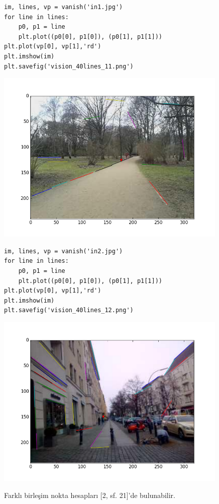 \documentclass[12pt,fleqn]{article}\usepackage{../../common}
\begin{document}
\begin{verbatim}
im, lines, vp = vanish('in1.jpg')
for line in lines:
    p0, p1 = line
    plt.plot((p0[0], p1[0]), (p0[1], p1[1]))
plt.plot(vp[0], vp[1],'rd')
plt.imshow(im)
plt.savefig('vision_40lines_11.png')
\end{verbatim}

\includegraphics[width=30em]{vision_40lines_11.png}

\begin{verbatim}
im, lines, vp = vanish('in2.jpg')
for line in lines:
    p0, p1 = line
    plt.plot((p0[0], p1[0]), (p0[1], p1[1]))
plt.plot(vp[0], vp[1],'rd')
plt.imshow(im)
plt.savefig('vision_40lines_12.png')
\end{verbatim}

\includegraphics[width=30em]{vision_40lines_12.png}

Farklı birleşim nokta hesapları [2, sf. 21]'de bulunabilir.
\end{document}
